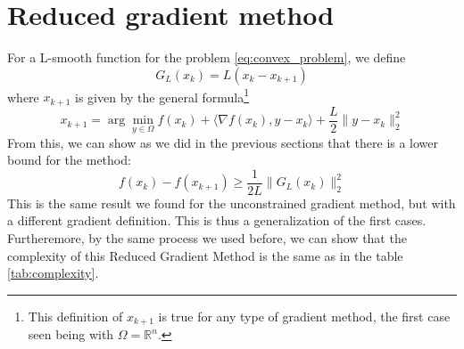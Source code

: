 \documentclass[12pt, openany]{report}
\theoremstyle{definition}
\begin{document}
\section{Reduced gradient method}
For a L-smooth function for the problem \eqref{eq:convex_problem}, we define 
\begin{equation}
    G_L(x_k) = L(x_k-x_{k+1})
\end{equation}
where \(x_{k+1}\) is given by the general formula\footnote{This definition of \(x_{k+1}\) is true for any type of gradient method, the first case seen being with \(\Omega = \mathbb{R}^n\).}
\begin{equation}
    x_{k+1} = \arg \min_{y\in \Omega} f(x_k) + \langle \nabla f(x_k),y-x_k\rangle +\frac{L}{2}\lVert y-x_k\rVert_2^2
\end{equation}
From this, we can show as we did in the previous sections that there is a lower bound for the method:
\begin{equation}
    f(x_k)-f(x_{k+1}) \ge \frac{1}{2L}\lVert G_L(x_k)\rVert_2^2
\end{equation}
This is the same result we found for the unconstrained gradient method, but with a different gradient definition. This is thus a generalization of the first cases. Furtheremore, by the same process we used before, we can show that the complexity of this Reduced Gradient Method is the same as in the table \ref{tab:complexity}.
\end{document}
